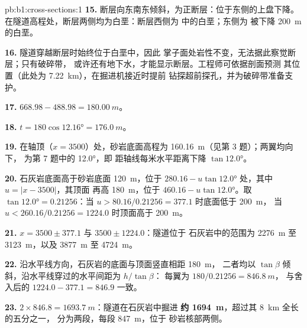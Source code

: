\begin{solution}{pb:b1:cross-sections:1}
\textbf{15.} 断层向东南东倾斜，为正断层：位于东侧的上盘下降。
在隧道高程处，断层两侧均为白垩：断层西侧为
中的白垩；东侧为
被下降 \qty{200}{m} 的白垩。

\textbf{16.} 隧道穿越断层时始终位于白垩中，因此
掌子面处岩性不变，无法据此察觉断层；只有破碎带，
或许还有地下水，才能显示断层。工程师可依据剖面预测
其位置（此处为 \qty{7.22}{km}），在掘进机接近时提前
钻探超前探孔，并为破碎带准备支护。

\textbf{17.} $668.98 - 488.98 = \qty{180.00}{m}$。

\textbf{18.} $t = 180\cos\ang{12.16} = \qty{176.0}{m}$。

\textbf{19.} 在轴顶（$x = 3500$）处，砂岩底面高程为
\qty{160.16}{m}（见第 3 题）；两翼均向下，
为第 7 题中的 \ang{12.0}，即
距轴线每米水平距离下降 $\tan\ang{12.0}$。

\textbf{20.} 石灰岩底面高于砂岩底面 \qty{120}{m}，位于
$280.16 - u\tan\ang{12.0}$ 处，其中 $u = |x - 3500|$，其顶面
再高 \qty{180}{m}，位于 $460.16 - u\tan\ang{12.0}$。取 $\tan\ang{12.0} =
0.21256$：当 $u > 80.16/0.21256 = 377.1$ 时底面低于 \qty{200}{m}，
当 $u < 260.16/0.21256 = 1224.0$ 时顶面高于 \qty{200}{m}。

\textbf{21.} $x = 3500 \pm 377.1$ 与 $3500 \pm 1224.0$：隧道位于
石灰岩中的范围为 \qty{2276}{m} 至 \qty{3123}{m}，以及 \qty{3877}{m} 至
\qty{4724}{m}。

\textbf{22.} 沿水平线方向，石灰岩的底面与顶面竖直相距 \qty{180}{m}，
二者均以 $\tan\beta$ 倾斜，沿水平线穿过的水平间距为 $h/\tan\beta$：
每翼为 $180/0.21256 = \qty{846.8}{m}$，
与舍入后的 $1224.0 - 377.1 = 846.9$ 一致。

\textbf{23.} $2\times846.8 = \qty{1693.7}{m}$：隧道在石灰岩中掘进
\textbf{约 \qty[text-series-to-math=true]{1694}{m}}，超过其 \qty{8}{km} 全长的五分之一，
分为两段，每段 \qty{847}{m}，位于
砂岩核部两侧。
\end{solution}

